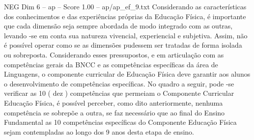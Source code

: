 \begin{textsample}{NEG Dim 6 – ap – Score 1.00 – ap/ap\_ef\_9.txt}
Considerando as características dos conhecimentos e das experiências próprias da Educação Física, é importante que cada dimensão seja sempre abordada de modo integrado com as outras, levando -se em conta sua natureza vivencial, experiencial e subjetiva.
Assim, não é possível operar como se as dimensões pudessem ser tratadas de forma isolada ou sobreposta.
Considerando esses pressupostos, e em articulação com as competências gerais da BNCC e as competências específicas da área de Linguagens, o componente curricular de Educação Física deve garantir aos alunos o desenvolvimento de competências específicas.
No quadro a seguir, pode -se verificar as 10 ( dez ) competências que permeiam o Componente Curricular Educação Física, é possível perceber, como dito anteriormente, nenhuma competência se sobrepõe a outra, se faz necessário que ao final do Ensino Fundamental as 10 competências específicas do Componente Educação Física sejam contempladas ao longo dos 9 anos desta etapa de ensino.

\end{textsample}
